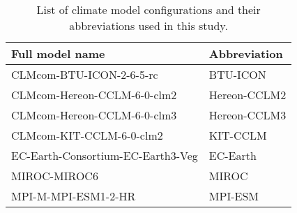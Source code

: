\begin{table}[htbp]
  \centering
  \caption{List of climate model configurations and their abbreviations used in this study.}
  \label{Table:model_abbrevs}
  \begin{tabular}{p{8cm}l}
    \toprule
    Full model name & Abbreviation \\
    \midrule
    CLMcom-BTU-ICON-2-6-5-rc & BTU-ICON \\
    CLMcom-Hereon-CCLM-6-0-clm2 & Hereon-CCLM2 \\
    CLMcom-Hereon-CCLM-6-0-clm3 & Hereon-CCLM3 \\
    CLMcom-KIT-CCLM-6-0-clm2 & KIT-CCLM \\
    EC-Earth-Consortium-EC-Earth3-Veg & EC-Earth \\
    MIROC-MIROC6 & MIROC \\
    MPI-M-MPI-ESM1-2-HR & MPI-ESM \\
    \bottomrule
  \end{tabular}
\end{table}
